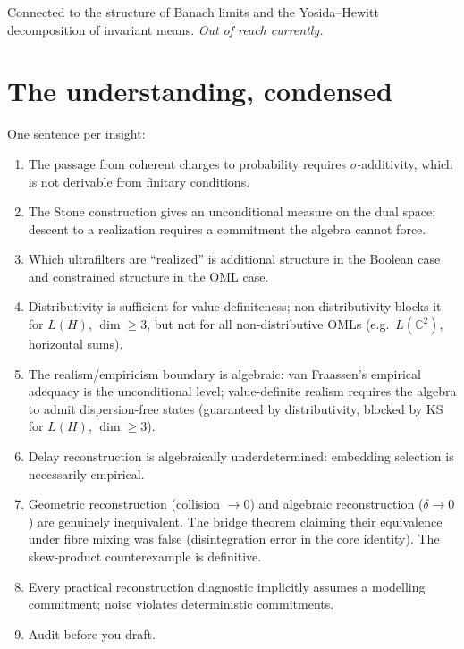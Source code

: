 \noindent
Connected to the structure of Banach limits and the
Yosida--Hewitt decomposition of invariant means.
\emph{Out of reach currently.}

\section{The understanding, condensed}
\label{sec:condensed}

One sentence per insight:

\begin{enumerate}
  \item The passage from coherent charges to probability requires
    $\sigma$-additivity, which is not derivable from finitary
    conditions.

  \item The Stone construction gives an unconditional measure on
    the dual space; descent to a realization requires a commitment
    the algebra cannot force.

  \item Which ultrafilters are ``realized'' is additional structure
    in the Boolean case and constrained structure in the OML case.

  \item Distributivity is sufficient for value-definiteness;
    non-distributivity blocks it for $L(H)$, $\dim \geq 3$, but
    not for all non-distributive OMLs (e.g.\ $L(\mathbb{C}^2)$,
    horizontal sums).

  \item The realism/empiricism boundary is algebraic:
    van Fraassen's empirical adequacy is the unconditional level;
    value-definite realism requires the algebra to admit
    dispersion-free states (guaranteed by distributivity,
    blocked by KS for $L(H)$, $\dim \geq 3$).

  \item Delay reconstruction is algebraically underdetermined:
    embedding selection is necessarily empirical.

  \item Geometric reconstruction (collision $\to 0$) and algebraic
    reconstruction ($\delta \to 0$) are genuinely inequivalent.
    The bridge theorem claiming their equivalence under fibre
    mixing was false (disintegration error in the core identity).
    The skew-product counterexample is definitive.

  \item Every practical reconstruction diagnostic implicitly
    assumes a modelling commitment; noise violates deterministic
    commitments.

  \item Audit before you draft.
\end{enumerate}

